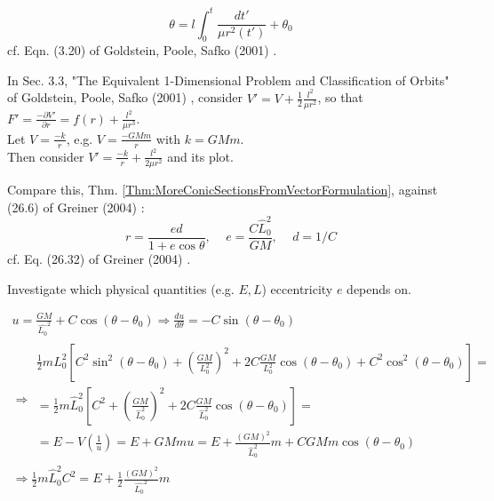 \documentclass[10pt]{amsart}
\begin{document}
\begin{multicols*}{2}
\begin{equation}
\theta = l \int_0^t \frac{dt'}{ \mu r^2(t') } + \theta_0
\end{equation}
cf. Eqn. (3.20) of Goldstein, Poole, Safko (2001) \cite{GPS2001}.

In Sec. 3.3, "The Equivalent 1-Dimensional Problem and Classification of Orbits" of  Goldstein, Poole, Safko (2001) \cite{GPS2001}, consider $V ' = V + \frac{1}{2} \frac{l^2}{\mu r^2}$, so that $F' = \frac{-\partial V'}{\partial r} = f(r) + \frac{l^2}{\mu r^3}$. \\

Let $V = \frac{-k}{r}$, e.g. $V = \frac{-GMm}{r} $ with $k = GMm$. \\

Then consider $V' = \frac{-k}{r} + \frac{l^2}{2\mu r^2}$ and its plot.


Compare this, Thm. \ref{Thm:MoreConicSectionsFromVectorFormulation}, against (26.6) of Greiner (2004) \cite{Grei2004}:
\begin{equation}\label{Eq:ConicSectionPolarCoordinatesFocusCenter}
r = \frac{ed}{ 1 + e\cos{\theta}}, \quad \, e = \frac{C\widehat{L}_0^2}{GM}, \quad \, d = 1/C
\end{equation} cf. Eq. (26.32) of Greiner (2004) \cite{Grei2004}. 

Investigate which physical quantities (e.g. $E, L$) eccentricity $e$ depends on.

\[
\begin{gathered}
u = \frac{GM}{ \widehat{L_0}^2 } + C \cos{(\theta - \theta_0)} \Longrightarrow \frac{du}{d\theta} = -C \sin{(\theta - \theta_0)} \\
\Longrightarrow \begin{gathered}
\frac{1}{2} m L_0^2 \left[ C^2 \sin^2{ (\theta - \theta_0)} + \left( \frac{GM}{L_0^2} \right)^2 + 2 C \frac{GM}{L_0^2} \cos{(\theta - \theta_0)} + C^2 \cos^2{(\theta - \theta_0)} \right] = \\
= \frac{1}{2} m \widehat{L}_0^2 \left[ C^2 + \left( \frac{GM}{\widehat{L}_0^2 } \right)^2 + 2 C \frac{GM}{ \widehat{L}_0^2 } \cos{(\theta - \theta_0)} \right] = \\
= E - V\left( \frac{1}{u} \right) = E + GMmu = E + \frac{(GM)^2 }{ \widehat{L}_0^2 } m + C GM m \cos{(\theta - \theta_0)}
\end{gathered} \\
\Longrightarrow \frac{1}{2} m \widehat{L}_0^2 C^2 = E + \frac{1}{2} \frac{ (GM)^2 }{ \widehat{L_0}^2 } m 
\end{gathered} 
\]


\end{multicols*}
\end{document}

